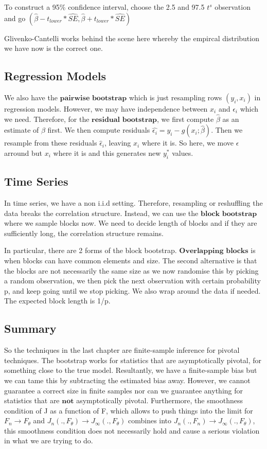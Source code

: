 \documentclass[twoside]{article}
\begin{document}
To construct a 95\% confidence interval, choose the 2.5 and 97.5 $t^{s}$ observation and go $(\hat{\beta} - t_{lower}*\hat{SE}, \hat{\beta} + t_{lower}*\hat{SE})$

Glivenko-Cantelli works behind the scene here whereby the empircal distribution we have now is the correct one.

\subsection{Regression Models}

We also have the $\textbf{pairwise bootstrap}$ which is just resampling rows $(y_i, x_i)$ in regression models. However, we may have independence between $x_i$ and $\epsilon_i$ which we need. Therefore, for the $\textbf{residual bootstrap}$, we first compute $\hat{\beta}$ as an estimate of $\beta$ first. We then compute residuals $\hat{\epsilon_i} = y_i - g(x_i;\hat{\beta})$. Then we resample from these residuals $\hat{\epsilon}_i$, leaving $x_i$ where it is. So here, we move $\epsilon$ arround but $x_i$ where it is and this generates new $y_i^*$ values.

\subsection{Time Series}
In time series, we have a non i.i.d setting. Therefore, resampling or reshuffling the data breaks the correlation structure. Instead, we can use the $\textbf{block bootstrap}$ where we sample blocks now. We need to decide length of blocks and if they are sufficiently long, the correlation structure remains.

In particular, there are 2 forms of the block bootstrap. $\textbf{Overlapping blocks}$ is when blocks can have common elements and size. The second alternative is that the blocks are not necessarily the same size as we now randomise this by picking a random observation, we then pick the next observation with certain probability p, and keep going until we stop picking. We also wrap around the data if needed. The expected block length is 1/p. 

\subsection{Summary}
So the techniques in the last chapter are finite-sample inference for pivotal techniques. The bootstrap works for statistics that are asymptotically pivotal, for something close to the true model. Resultantly, we have a finite-sample bias but we can tame this by subtracting the estimated bias away. However, we cannot guarantee a correct size in finite samples nor can we guarantee anything for statistics that are $\textbf{not}$ asymptotically pivotal. Furthermore, the smoothness condition of J as a function of F, which allows to push things into the limit for $F_n \rightarrow F_{\theta}$ and $J_n(.,F_{\theta}) \rightarrow J_{\infty}(.,F_{\theta})$ combines into $J_n(.,F_{n}) \rightarrow J_{\infty}(.,F_{\theta})$, this smoothness condition does not necessarily hold and cause a serious violation in what we are trying to do.
\end{document}
